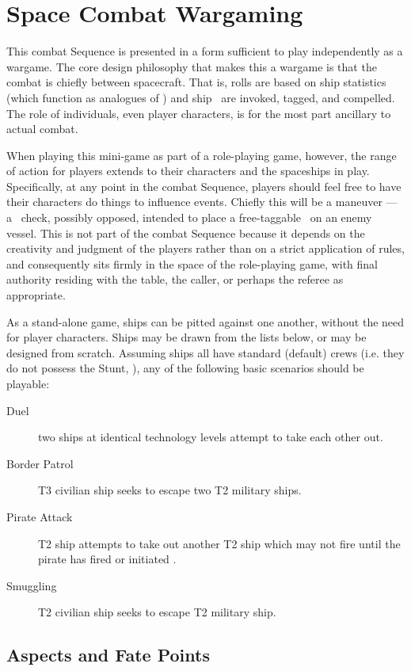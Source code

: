 \section[Wargaming]{Space Combat Wargaming}
\label{sec:space-combat-wargaming}

This combat Sequence is presented in a form sufficient to play independently as a wargame. The core design philosophy that makes this a wargame is that the combat is chiefly between spacecraft. That is, rolls are based on ship statistics (which function as analogues of \Skills) and ship \Aspects\ are invoked, tagged, and compelled. The role of individuals, even player characters, is for the most part ancillary to actual combat.

When playing this mini-game as part of a role-playing game, however, the range of action for players extends to their characters and the spaceships in play. Specifically, at any point in the combat Sequence, players should feel free to have their characters do things to influence events. Chiefly this will be a maneuver --- a \Skill\ check, possibly opposed, intended to place a free-taggable \Aspect\ on an enemy vessel. This is not part of the combat Sequence because it depends on the creativity and judgment of the players rather than on a strict application of rules, and consequently sits firmly in the space of the role-playing game, with final authority residing with the table, the caller, or perhaps the referee as appropriate.

As a stand-alone game, ships can be pitted against one another, without the need for player characters. Ships may be drawn from the lists below, or may be designed from scratch. Assuming ships all have standard (default) crews (i.e. they do not possess the Stunt, ), any of the following basic scenarios should be playable:
\begin{description}
\item[Duel]
two ships at identical technology levels attempt to take each other out.
\item[Border Patrol]
T3 civilian ship seeks to escape two T2 military ships.
\item[Pirate Attack]
T2 ship attempts to take out another T2 ship which may not fire until the pirate has fired or initiated .
\item[Smuggling]
T2 civilian ship seeks to escape T2 military ship.
\end{description}

\subsection{Aspects and Fate Points}
\label{sec:Aspects and Fate Points}

